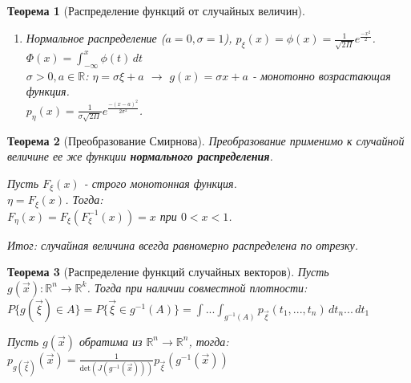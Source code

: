 \documentclass[14pt]{extarticle}
\theoremstyle{breakstyle}
\newtheorem{theorem}{Теорема}[subsection]
\begin{document}
\begin{theorem}[Распределение функций от случайных величин]
\begin{enumerate}
    \item Нормальное распределение ($a = 0, \sigma = 1$), $p_{\xi}(x) = \phi(x) = \frac{1}{\sqrt{2\Pi}}e^{\frac{-x^{2}}{2}}$.\\
          $\Phi(x) = \int_{-\infty}^{x}\phi(t) \, dt$ \\
          $\sigma > 0, a \in \mathbb{R}$: $\eta = \sigma \xi + a$ $\rightarrow$ $g(x) = \sigma x + a$ - монотонно возрастающая функция.\\
          $p_{\eta}(x) = \frac{1}{\sigma \sqrt{2\Pi}}e^{\frac{-(x-a)^2}{2\sigma^{2}}}$.
\end{enumerate}

\end{theorem}

\begin{theorem}[Преобразование Смирнова]

Преобразование применимо к случайной величине ее же функции \textbf{нормального распределения}.

\vspace{\baselineskip}

Пусть $F_{\xi}(x)$ - строго монотонная функция.\\
$\eta = F_{\xi}(x)$. Тогда:\\
$F_{\eta}(x) = F_{\xi}(F_{\xi}^{-1}(x)) = x$ при $0 < x < 1$.

\vspace{\baselineskip}

Итог: случайная величина всегда равномерно распределена по отрезку.

\end{theorem}

\begin{theorem}[Распределение функций случайных векторов]

Пусть $g(\vec{x}): \mathbb{R}^{n} \rightarrow \mathbb{R}^{k}$. Тогда при наличии совместной плотности:\\
$P\{g(\vec{\xi}) \in A\} = P\{\vec{\xi} \in g^{-1}(A)\} = \int ... \int_{g^{-1}(A)} p_{\vec{\xi}}(t_1, ..., t_n) \, dt_n ... \, dt_1$

\vspace{\baselineskip}

Пусть $g(\vec{x})$ обратима из $\mathbb{R}^{n} \rightarrow \mathbb{R}^{n}$, тогда:\\
$p_{g(\vec{\xi})}(\vec{x}) = \frac{1}{\text{det}(J(g^{-1}(\vec{x})))}p_{\vec{\xi}}(g^{-1}(\vec{x}))$

\end{theorem}
\end{document}
